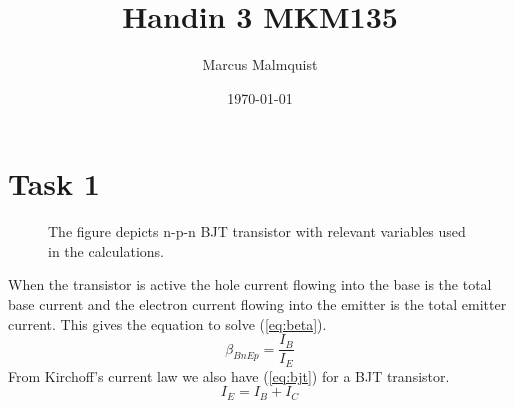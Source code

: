 \documentclass[12pt,a4paper]{article}
\title{Handin 3 MKM135}
\author{Marcus Malmquist}
\date{\today}
\begin{document}
\maketitle
\section{Task 1}
\begin{figure}[!ht]
  \centering
  \noindent{}
  \caption{The figure depicts n-p-n BJT transistor with relevant variables used in the calculations.}
  \label{fig:schematic}
\end{figure}
When the transistor is active the hole current flowing into the base is the total base current and the electron current flowing into the emitter is the total emitter current.
This gives the equation to solve (\ref{eq:beta}).
\begin{equation}
  \label{eq:beta}
  \beta_{BnEp}=\frac{I_{B}}{I_{E}}
\end{equation}
From Kirchoff's current law we also have (\ref{eq:bjt}) for a BJT transistor.
\begin{equation}
  \label{eq:bjt}
  I_{E}=I_{B}+I_{C}
\end{equation}
\end{document}
